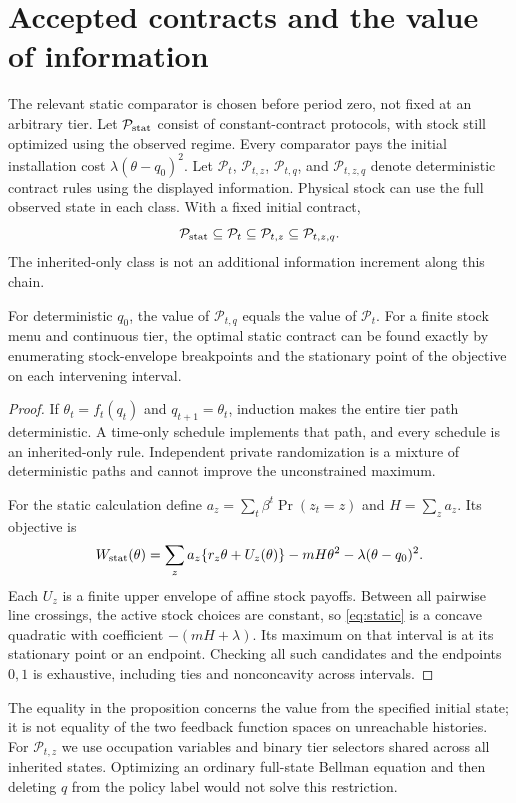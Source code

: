 \section{Accepted contracts and the value of information}\label{sec:accepted}
The relevant static comparator is chosen before period zero, not fixed at an arbitrary tier. Let $\mathcal P_{\rm stat}$ consist of constant-contract protocols, with stock still optimized using the observed regime. Every comparator pays the initial installation cost $\lambda(\theta-q_0)^2$. Let $\mathcal P_t$, $\mathcal P_{t,z}$, $\mathcal P_{t,q}$, and $\mathcal P_{t,z,q}$ denote deterministic contract rules using the displayed information. Physical stock can use the full observed state in each class. With a fixed initial contract,
\begin{equation}\label{eq:classes}
 \mathcal P_{\rm stat}\subseteq\mathcal P_t
 \subseteq\mathcal P_{t,z}\subseteq\mathcal P_{t,z,q}.
\end{equation}
The inherited-only class is not an additional information increment along this chain.
\begin{proposition}\label{prop:classes}
For deterministic $q_0$, the value of $\mathcal P_{t,q}$ equals the value of $\mathcal P_t$. For a finite stock menu and continuous tier, the optimal static contract can be found exactly by enumerating stock-envelope breakpoints and the stationary point of the objective on each intervening interval.
\end{proposition}
\begin{proof}
If $\theta_t=f_t(q_t)$ and $q_{t+1}=\theta_t$, induction makes the entire tier path deterministic. A time-only schedule implements that path, and every schedule is an inherited-only rule. Independent private randomization is a mixture of deterministic paths and cannot improve the unconstrained maximum.

For the static calculation define $a_z=\sum_t\beta^t\Pr(z_t=z)$ and $H=\sum_z a_z$. Its objective is
\begin{equation}\label{eq:static}
 W_{\rm stat}(\theta)=\sum_z a_z\{r_z\theta+U_z(\theta)\}
             -mH\theta^2-\lambda(\theta-q_0)^2.
\end{equation}
Each $U_z$ is a finite upper envelope of affine stock payoffs. Between all pairwise line crossings, the active stock choices are constant, so \eqref{eq:static} is a concave quadratic with coefficient $-(mH+\lambda)$. Its maximum on that interval is at its stationary point or an endpoint. Checking all such candidates and the endpoints $0,1$ is exhaustive, including ties and nonconcavity across intervals.\end{proof}
The equality in the proposition concerns the value from the specified initial state; it is not equality of the two feedback function spaces on unreachable histories. For $\mathcal P_{t,z}$ we use occupation variables and binary tier selectors shared across all inherited states. Optimizing an ordinary full-state Bellman equation and then deleting $q$ from the policy label would not solve this restriction.

